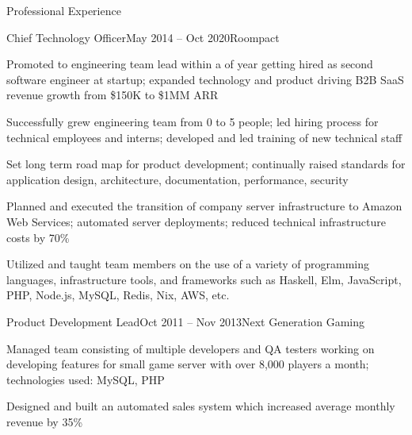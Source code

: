 \documentclass{resume} %
\begin{document}
\begin{rSection}{Professional Experience}
\begin{rSubsection}{Chief Technology Officer}{May 2014 -- Oct 2020}{Roompact}{}
\item Promoted to engineering team lead within a of year getting hired as second software engineer at startup; expanded technology and product driving B2B SaaS revenue growth from \$150K to \$1MM ARR
  \item Successfully grew engineering team from 0 to 5 people; led hiring process for technical employees and interns; developed and led training of new technical staff
  \item Set long term road map for product development; continually raised standards for application design, architecture, documentation, performance, security
  \item Planned and executed the transition of company server infrastructure to Amazon Web Services; automated server deployments; reduced technical infrastructure costs by 70\%
  \item Utilized and taught team members on the use of a variety of programming languages, infrastructure tools, and frameworks such as Haskell, Elm, JavaScript, PHP, Node.js, MySQL, Redis, Nix, AWS, etc.
\end{rSubsection}


\begin{rSubsection}{Product Development Lead}{Oct 2011 -- Nov 2013}{Next Generation Gaming}{}
  \item Managed team consisting of multiple developers and QA testers working on developing features for small game server with over 8,000 players a month; technologies used: MySQL, PHP
  \item Designed and built an automated sales system which increased average monthly revenue by 35\%
\end{rSubsection}

\end{rSection}

\end{document}

